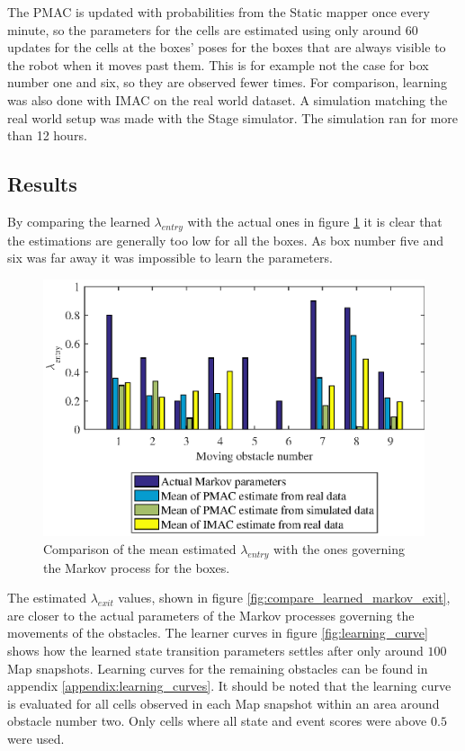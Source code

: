 The PMAC is updated with probabilities from the Static mapper once every minute, so the parameters for the cells are estimated using only around $60$ updates for the cells at the boxes' poses for the boxes that are always visible to the robot when it moves past them.
This is for example not the case for box number one and six, so they are observed fewer times.
For comparison, learning was also done with IMAC on the real world dataset. 
A simulation matching the real world setup was made with the Stage simulator. 
The simulation ran for more than 12 hours. 

\subsection{Results}
By comparing the learned $\lambda_{entry}$ with the actual ones in figure \ref{fig:compare_learned_markov_entry} it is clear that the estimations are generally too low for all the boxes.
As box number five and six was far away it was impossible to learn the parameters.

\begin{figure}
    \centering
    \includegraphics[scale=1]{chapters/evaluation/figures/compare_learned_markov_entry}
    \caption{Comparison of the mean estimated $\lambda_{entry}$ with the ones governing the Markov process for the boxes.}
    \label{fig:compare_learned_markov_entry}
\end{figure}

The estimated $\lambda_{exit}$ values, shown in figure \ref{fig:compare_learned_markov_exit}, are closer to the actual parameters of the Markov processes governing the movements of the obstacles.
The learner curves in figure \ref{fig:learning_curve} shows how the learned state transition parameters settles after only around $100$ Map snapshots.
Learning curves for the remaining obstacles can be found in appendix \ref{appendix:learning_curves}. 
It should be noted that the learning curve is evaluated for all cells observed in each Map snapshot within an area around obstacle number two. 
Only cells where all state and event scores were above $0.5$ were used. 

